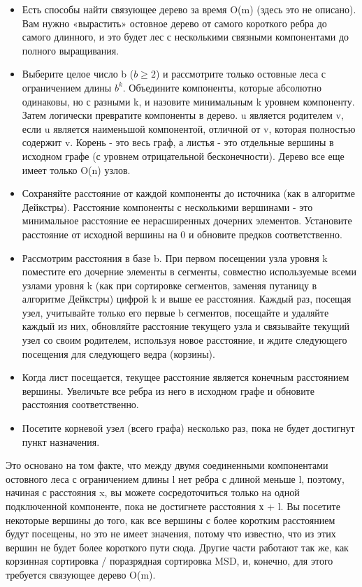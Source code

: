 \begin{itemize}
    \item Есть способы найти связующее дерево за время O(m) (здесь это не описано). Вам нужно «вырастить» остовное дерево от самого короткого ребра до самого длинного, и это будет лес с несколькими связными компонентами до полного выращивания.
    \item Выберите целое число b ($b \geq 2$) и рассмотрите только остовные леса с ограничением длины $b^k$. Объедините компоненты, которые абсолютно одинаковы, но с разными k, и назовите минимальным k уровнем компоненту. Затем логически превратите компоненты в дерево. u является родителем v, если u является наименьшой компонентой, отличной от v, которая полностью содержит v. Корень - это весь граф, а листья - это отдельные вершины в исходном графе (с уровнем отрицательной бесконечности). Дерево все еще имеет только O(n) узлов.
    \item Сохраняйте расстояние от каждой компоненты до источника (как в алгоритме Дейкстры). Расстояние компоненты с несколькими вершинами - это минимальное расстояние ее нерасширенных дочерних элементов. Установите расстояние от исходной вершины на 0 и обновите предков соответственно.
    \item Рассмотрим расстояния в базе b. При первом посещении узла уровня k поместите его дочерние элементы в сегменты, совместно используемые всеми узлами уровня k (как при сортировке сегментов, заменяя путаницу в алгоритме Дейкстры) цифрой k и выше ее расстояния. Каждый раз, посещая узел, учитывайте только его первые b сегментов, посещайте и удаляйте каждый из них, обновляйте расстояние текущего узла и связывайте текущий узел со своим родителем, используя новое расстояние, и ждите следующего посещения для следующего ведра (корзины).
    \item Когда лист посещается, текущее расстояние является конечным расстоянием вершины. Увеличьте все ребра из него в исходном графе и обновите расстояния соответственно.
    \item Посетите корневой узел (всего графа) несколько раз, пока не будет достигнут пункт назначения.
\end{itemize}

Это основано на том факте, что между двумя соединенными компонентами остовного леса с ограничением длины l нет ребра с длиной меньше l, поэтому, начиная с расстояния x, вы можете сосредоточиться только на одной подключенной компоненте, пока не достигнете расстояния х + l. Вы посетите некоторые вершины до того, как все вершины с более коротким расстоянием будут посещены, но это не имеет значения, потому что известно, что из этих вершин не будет более короткого пути сюда. Другие части работают так же, как корзинная сортировка / поразрядная сортировка MSD, и, конечно, для этого требуется связующее дерево O(m).